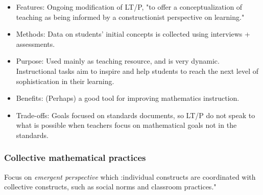 \documentclass{TC}
\begin{document}
\begin{multicols}{2}
\begin{itemize}
\item Features: Ongoing modification of LT/P, "to offer a conceptualization of teaching as being informed by a constructionist perspective on learning."
\item Methods: Data on students' initial concepts is collected using interviews + assessments.
\item Purpose: Used mainly as teaching resource, and is very dynamic. Instructional tasks aim to inspire and help students to reach the next level of sophistication in their learning.
\item Benefits: (Perhaps) a good tool for improving mathematics instruction. 
\item Trade-offs: Goals focused on standards documents, so LT/P do not speak to what is possible when teachers focus on mathematical goals not in the standards.
 \end{itemize}
 \end{multicols}
 
\subsubsection{Collective mathematical practices}

 Focus on \emph{emergent perspective} which :individual constructs are coordinated with collective constructs, such as social norms and classroom practices."
 
\end{document}
